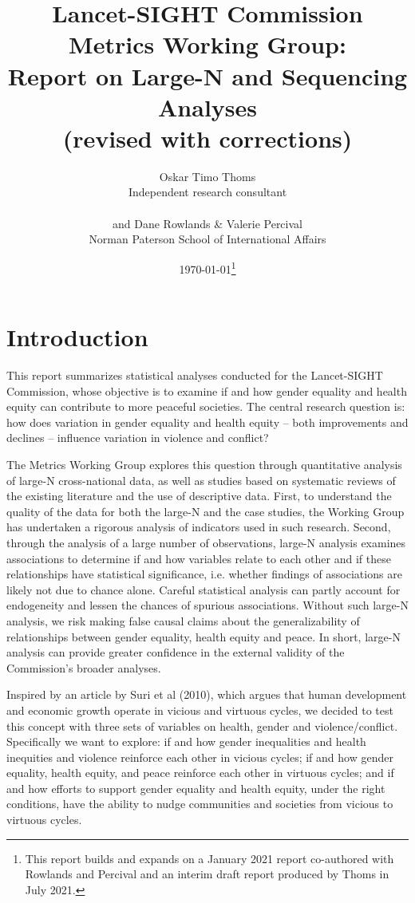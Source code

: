 \documentclass[12pt]{article}
\author{Oskar Timo Thoms\\Independent research consultant\\ \\ and Dane Rowlands \& Valerie Percival\\Norman Paterson School of International Affairs}
\title{Lancet-SIGHT Commission Metrics Working Group:\\Report on Large-N and Sequencing Analyses\\(revised with corrections)}
\date{\today\thanks{This report builds and expands on a January 2021 report co-authored with Rowlands and Percival and an interim draft report produced by Thoms in July 2021.}}
\begin{document}
\maketitle
\clearpage
\tableofcontents
\clearpage

\section{Introduction}
\label{intro}

This report summarizes statistical analyses conducted for the Lancet-SIGHT Commission, whose objective is to examine if and how gender equality and health equity can contribute to more peaceful societies.
The central research question is: how does variation in gender equality and health equity -- both improvements and declines -- influence variation in violence and conflict?

The Metrics Working Group explores this question through quantitative analysis of large-N cross-national data, as well as studies based on systematic reviews of the existing literature and the use of descriptive data. First, to understand the quality of the data for both the large-N and the case studies, the Working Group has undertaken a rigorous analysis of indicators used in such research.
Second, through the analysis of a large number of observations, large-N analysis examines associations to determine if and how variables relate to each other and if these relationships have statistical significance, i.e. whether findings of associations are likely not due to chance alone.
Careful statistical analysis can partly account for endogeneity and lessen the chances of spurious associations. Without such large-N analysis, we risk making false causal claims about the generalizability of relationships between gender equality, health equity and peace. In short, large-N analysis can provide greater confidence in the external validity of the Commission's broader analyses.

Inspired by an article by Suri et al (2010), which argues that human development and economic growth operate in vicious and virtuous cycles, we decided to test this concept with three sets of variables on health, gender and violence/conflict. Specifically we want to explore:
if and how gender inequalities and health inequities and violence reinforce each other in vicious cycles;
if and how gender equality, health equity, and peace reinforce each other in virtuous cycles;
and if and how efforts to support gender equality and health equity, under the right conditions, have the ability to nudge communities and societies from vicious to virtuous cycles.
\end{document}
